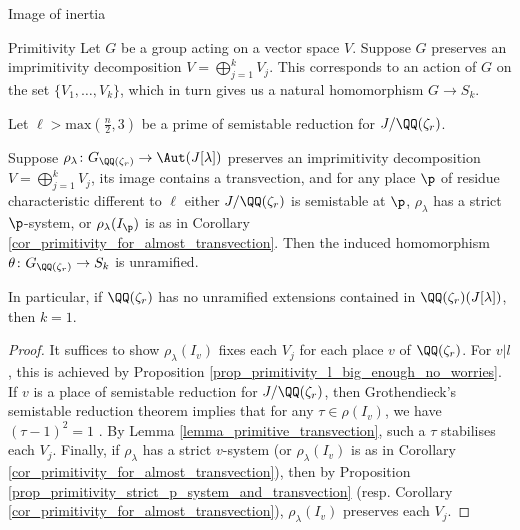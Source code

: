 \documentclass[11pt,a4paper]{article}
\newcommand{\Qr}{{\QQ(\zeta_r)}}
\newcommand{\GQr}{G_{\QQ(\zeta_{r})}}
\begin{document}
\begin{section}{Image of inertia}
\begin{subsection}{Primitivity}
Let $G$ be a group acting on a vector space $V$. Suppose $G$ preserves an imprimitivity decomposition $V = \bigoplus_{j=1}^kV_j$. This corresponds to an action of $G$ on the set $\{V_1, \ldots , V_k\}$, which in turn gives us a natural homomorphism $G\rightarrow S_k$.

\begin{lemma}
\label{lemma_primitivity_p-systems_imply_primtive_when_no_unramified_extensions}
 Let $\ell> \mathrm{max}(\frac{n}{2},3)$ be a prime of semistable reduction for $J/\Qr$.
 
Suppose $\rho_\lambda\colon \GQr \rightarrow \Aut(J[\lambda])$ preserves an imprimitivity decomposition $V=\bigoplus^{k}_{j=1}V_j$, its image contains a transvection, and for any place $\p$ of residue characteristic different to $\ell$ either $J/\Qr$ is semistable at $\p$, $\rho_\lambda$ has a strict $\p$-system, or $\rho_\lambda(I_\p)$ is as in Corollary \ref{cor_primitivity_for_almost_transvection}. Then the induced homomorphism $\theta\colon \GQr \rightarrow S_k$ is unramified.
 
 In particular, if $\Qr$ has no unramified extensions contained in $\Qr(J[\lambda])$, then $k=1$.
\end{lemma}

\begin{proof}
It suffices to show $\rho_\lambda(I_v)$ fixes each $V_j$ for each place $v$ of $\Qr$.
For $v|l$, this is achieved by Proposition \ref{prop_primitivity_l_big_enough_no_worries}.
If $v$ is a place of semistable reduction for $J/\Qr$, then Grothendieck's semistable reduction theorem implies that for any $\tau \in \rho(I_v)$, we have $(\tau-1)^2=1$ \cite[Proposition 3.5]{SGA7} \cite[Page 184, Thm 6]{Neron_models_BLR_book}. By Lemma \ref{lemma_primitive_transvection}, such a $\tau$ stabilises each $V_j$.
Finally, if $\rho_\lambda$ has a strict $v$-system (or $\rho_\lambda(I_v)$ is as in Corollary \ref{cor_primitivity_for_almost_transvection}), then by Proposition \ref{prop_primitivity_strict_p_system_and_transvection} (resp. Corollary \ref{cor_primitivity_for_almost_transvection}), $\rho_\lambda(I_v)$ preserves each $V_j$.
\end{proof}


\end{subsection}
\end{section}
\end{document}
